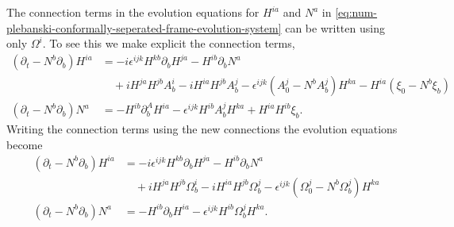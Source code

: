 \documentclass[10pt]{report}
\theoremstyle{definition}
\begin{document}
        The connection terms in the evolution equations for $H^{ia}$ and $N^a$ in \cref{eq:num-plebanski-conformally-seperated-frame-evolution-system} can be written using only $\Omega^i$. To see this we make explicit the connection terms, 
        \begin{align}
            (\partial_t - N^b \partial_b) H^{ia} &= -i \epsilon^{ijk} H^{kb} \partial_b H^{ja} - H^{ib} \partial_b N^a \nonumber\\ & \quad +i H^{ja} H^{jb} A^i_b - i H^{ia} H^{jb} A^j_b - \epsilon^{ijk}(A^j_0 - N^b A^j_b) H^{ka} - H^{ia} (\xi_0 - N^b \xi_b) \\
            (\partial_t - N^b \partial_b) N^a &= - H^{ib} \partial_b^A H^{ia} - \epsilon^{ijk} H^{ib} A^j_b H^{ka} + H^{ia} H^{ib} \xi_b.
        \end{align}
        Writing the connection terms using the new connections the evolution equations become 
        \begin{align}
            (\partial_t - N^b \partial_b) H^{ia} &= -i \epsilon^{ijk} H^{kb} \partial_b H^{ja} - H^{ib} \partial_b N^a \nonumber\\ & \quad +i H^{ja} H^{jb} \Omega^i_b - i H^{ia} H^{jb} \Omega^j_b - \epsilon^{ijk}(\Omega^j_0 - N^b \Omega^j_b) H^{ka} \\
            (\partial_t - N^b \partial_b) N^a &= - H^{ib} \partial_b H^{ia} - \epsilon^{ijk} H^{ib} \Omega^j_b H^{ka}.
        \end{align}
\end{document}
